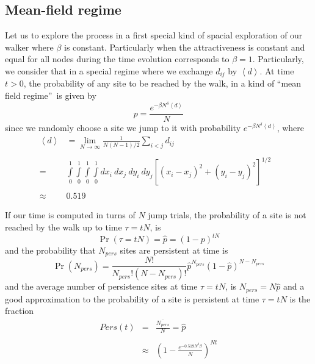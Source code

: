 \documentclass[3p, 11pt]{elsarticle}
\begin{document}
\subsection{Mean-field regime}

\label{Sec:Mean-Field-regime}

Let us to explore the process in a first special kind of spacial exploration
of our walker where $\beta $ is constant. Particularly when the
attractiveness is constant and equal for all nodes during the time evolution
corresponds to $\beta =1$. Particularly, we consider that in a special
regime where we exchange $d_{ij}$ by $\left\langle d\right\rangle $. At time 
$t>0$, the probability of any site to be reached by the walk, in a kind of
\textquotedblleft mean field regime\textquotedblright\ is given by 
\begin{equation*}
p=\frac{e^{-\beta N^{\delta }\left\langle d\right\rangle }}{N}
\end{equation*}%
since we randomly choose a site we jump to it with probability $e^{-\beta
N^{\delta }\left\langle d\right\rangle }$, where 
\begin{equation*}
\begin{array}{lll}
\left\langle d\right\rangle & =\lim_{N\rightarrow \infty }\frac{1}{N(N-1)/2}%
\sum_{i<j}d_{ij} &  \\ 
&  &  \\ 
= & \int\limits_{0}^{1}\int\limits_{0}^{1}\int\limits_{0}^{1}\int%
\limits_{0}^{1}dx_{i}\ dx_{j}\ dy_{i}\ dy_{j}\left[
(x_{i}-x_{j})^{2}+(y_{i}-y_{j})^{2}\right] ^{1/2} &  \\ 
&  &  \\ 
\approx & 0.519 & 
\end{array}%
\end{equation*}

If our time is computed in turns of $N$ jump trials, the probability of a
site is not reached by the walk up to time $\tau =tN$, is%
\begin{equation*}
\Pr (\tau =tN)=\hat{p}=(1-p)^{tN}
\end{equation*}%
and the probability that $N_{pers}$ sites are persistent at time is%
\begin{equation*}
\Pr (N_{pers})=\frac{N!}{N_{pers}!(N-N_{pers})!}\hat{p}^{N_{pers}}(1-\hat{p}%
)^{N-N_{pers}}
\end{equation*}%
and the average number of persistence sites at time $\tau =tN$, is $%
N_{pers}=N\hat{p}$ and a good approximation to the probability of a site is
persistent at time $\tau =tN$ is the fraction 
\begin{equation*}
\begin{array}{lll}
Pers(t) & = & \frac{\overline{N_{pers}}}{N}=\hat{p} \\ 
&  &  \\ 
& \approx & \left( 1-\frac{e^{-0.519N^{\delta }\beta }}{N}\right) ^{Nt}%
\end{array}%
\end{equation*}
\end{document}
